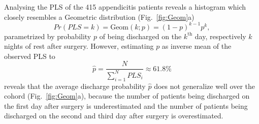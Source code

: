 Analysing the PLS of the 415 appendicitis patients reveals a
histogram which closely resembles a Geometric distribution (Fig.~\ref{fig:Geom}a)
\begin{equation}
Pr(PLS=k) = \text{Geom}(k; p) = (1-p)^{k-1}p^{k},
\end{equation}
parametrized by probability $p$ of being discharged on the $k^\text{th}$ day, respectively $k$ nights of rest after surgery. 
However, estimating $p$ as inverse mean of the observed PLS to 
\begin{equation}
 \hat{p} = \frac{N}{\sum\limits_{i=1}^N PLS_i} \approx 61.8\%	
\end{equation}
reveals that the average discharge probability $\hat{p}$ does not
generalize well over the cohord (Fig.~\ref{fig:Geom}a), because the number of patients being discharged on the first day after surgery is underestimated and the number of patients being discharged on the second and third day after surgery is overestimated.


